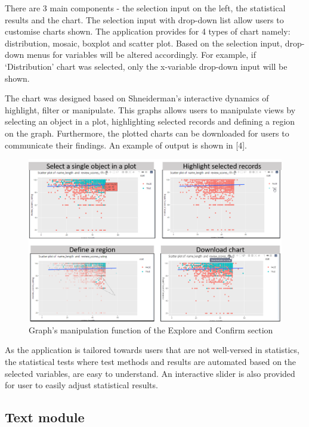 \documentclass{acm_proc_article-sp}
\begin{document}
There are 3 main components - the selection input on the left, the
statistical results and the chart. The selection input with drop-down
list allow users to customise charts shown. The application provides for
4 types of chart namely: distribution, mosaic, boxplot and scatter plot.
Based on the selection input, drop-down menus for variables will be
altered accordingly. For example, if `Distribution' chart was selected,
only the x-variable drop-down input will be shown.

The chart was designed based on Shneiderman's interactive dynamics of
highlight, filter or manipulate. This graphs allows users to manipulate
views by selecting an object in a plot, highlighting selected records
and defining a region on the graph. Furthermore, the plotted charts can
be downloaded for users to communicate their findings. An example of
output is shown in {[}4{]}.

\begin{figure}[H]

{\centering \includegraphics[width=1\linewidth]{images/design_explore2} 

}

\caption{Graph's manipulation function of the Explore and Confirm section}\label{fig:unnamed-chunk-4}
\end{figure}

As the application is tailored towards users that are not well-versed in
statistics, the statistical tests where test methods and results are
automated based on the selected variables, are easy to understand. An
interactive slider is also provided for user to easily adjust
statistical results.

\hypertarget{text-module}{%
\subsection{Text module}\label{text-module}}
\end{document}
